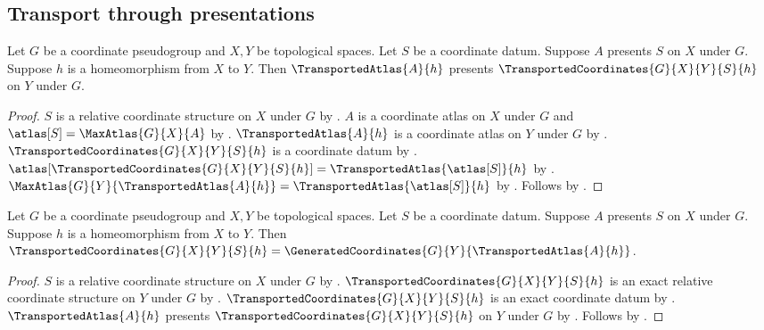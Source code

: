 \subsection{Transport through presentations}

\begin{theorem}\label{transported_coordinates_presentation}
    Let $G$ be a coordinate pseudogroup and $X,Y$ be topological spaces.
    Let $S$ be a coordinate datum.
    Suppose $A$ presents $S$ on $X$ under $G$.
    Suppose $h$ is a homeomorphism from $X$ to $Y$.
    Then $\TransportedAtlas{A}{h}$ presents $\TransportedCoordinates{G}{X}{Y}{S}{h}$
        on $Y$ under $G$.
\end{theorem}
\begin{proof}
    $S$ is a relative coordinate structure on $X$ under $G$ by .
    $A$ is a coordinate atlas on $X$ under $G$ and $\atlas[S]=\MaxAtlas{G}{X}{A}$ by
        .
    $\TransportedAtlas{A}{h}$ is a coordinate atlas on $Y$ under $G$ by
        .
    $\TransportedCoordinates{G}{X}{Y}{S}{h}$ is a coordinate datum by
        .
    $\atlas[\TransportedCoordinates{G}{X}{Y}{S}{h}]=\TransportedAtlas{\atlas[S]}{h}$ by
        .
    $\MaxAtlas{G}{Y}{\TransportedAtlas{A}{h}}=\TransportedAtlas{\atlas[S]}{h}$ by
        .
    Follows by .
\end{proof}

\begin{theorem}\label{transported_coordinates_from_presentation}
    Let $G$ be a coordinate pseudogroup and $X,Y$ be topological spaces.
    Let $S$ be a coordinate datum.
    Suppose $A$ presents $S$ on $X$ under $G$.
    Suppose $h$ is a homeomorphism from $X$ to $Y$.
    Then $\TransportedCoordinates{G}{X}{Y}{S}{h}
        =\GeneratedCoordinates{G}{Y}{\TransportedAtlas{A}{h}}$.
\end{theorem}
\begin{proof}
    $S$ is a relative coordinate structure on $X$ under $G$ by .
    $\TransportedCoordinates{G}{X}{Y}{S}{h}$ is an exact relative coordinate structure
        on $Y$ under $G$ by .
    $\TransportedCoordinates{G}{X}{Y}{S}{h}$ is an exact coordinate datum by
        .
    $\TransportedAtlas{A}{h}$ presents $\TransportedCoordinates{G}{X}{Y}{S}{h}$
        on $Y$ under $G$ by .
    Follows by .
\end{proof}

